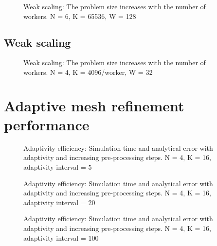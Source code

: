 \begin{figure}[H]
	\centering
	
	\caption{Weak scaling: The problem size increases with the number of workers. N = 6, K = 65536, W = 128}
	\label{fig:strong_scaling_N6_W128}
\end{figure}

\subsection{Weak scaling} \label{section:results:scaling_tests:weak}

\begin{figure}[H]
	\centering
	
	\caption{Weak scaling: The problem size increases with the number of workers. N = 4, K = 4096/worker, W = 32}
	\label{fig:weak_scaling}
\end{figure}

\section{Adaptive mesh refinement performance} \label{section:results:adaptivity_performance}

\begin{figure}[H]
	\centering
	
	\caption{Adaptivity efficiency: Simulation time and analytical error with adaptivity and increasing pre-processing steps. N = 4, K = 16, adaptivity interval = 5}
	\label{fig:adaptivity_efficiency_C5}
\end{figure}

\begin{figure}[H]
	\centering
	
	\caption{Adaptivity efficiency: Simulation time and analytical error with adaptivity and increasing pre-processing steps. N = 4, K = 16, adaptivity interval = 20}
	\label{fig:adaptivity_efficiency_C20}
\end{figure}

\begin{figure}[H]
	\centering
	
	\caption{Adaptivity efficiency: Simulation time and analytical error with adaptivity and increasing pre-processing steps. N = 4, K = 16, adaptivity interval = 100}
	\label{fig:adaptivity_efficiency_C100}
\end{figure}

